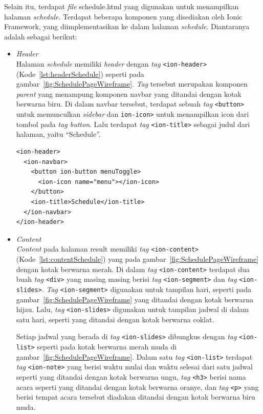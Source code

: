\begin{enumerate}
	Selain itu, terdapat \textit{file} schedule.html yang digunakan untuk menampilkan halaman \textit{schedule}. Terdapat beberapa komponen yang disediakan oleh Ionic Framework, yang diimplementasikan ke dalam halaman \textit{schedule}. Diantaranya adalah sebagai berikut:
	
	\begin{itemize}
		\item \textit{Header} \\
		Halaman \textit{schedule} memiliki \textit{header} dengan \textit{tag} \texttt{<ion-header>} (Kode~\ref{lst:headerSchedule}) seperti pada gambar~\ref{fig:SchedulePageWireframe}. \textit{Tag} tersebut merupakan komponen \textit{parent} yang menampung komponen navbar yang ditandai dengan kotak berwarna biru. Di dalam navbar tersebut, terdapat sebuah \textit{tag} \texttt{<button>} untuk memunculkan \textit{sidebar} dan \texttt{ion-icon>} untuk menampilkan icon dari tombol pada \textit{tag button}. Lalu terdapat \textit{tag} \texttt{<ion-title>} sebagai judul dari halaman, yaitu ``Schedule''.
		
\begin{lstlisting}[label={lst:headerSchedule}, caption=\textit{Header} pada schedule.html]
<ion-header>
  <ion-navbar>
    <button ion-button menuToggle>
      <ion-icon name="menu"></ion-icon>
    </button>
    <ion-title>Schedule</ion-title>
  </ion-navbar>
</ion-header>
\end{lstlisting} 

		\item \textit{Content} \\
		\textit{Content} pada halaman result memiliki \textit{tag} \texttt{<ion-content>} (Kode~\ref{lst:contentSchedule}) yang pada gambar~\ref{fig:SchedulePageWireframe} dengan kotak berwarna merah. Di dalam \textit{tag} \texttt{<ion-content>} terdapat dua buah \textit{tag} \texttt{<div>} yang masing masing berisi \textit{tag} \texttt{<ion-segment>} dan \textit{tag} \texttt{<ion-slides>}. \textit{Tag} \texttt{<ion-segment>} digunakan untuk tampilan hari, seperti pada gambar~\ref{fig:SchedulePageWireframe} yang ditandai dengan kotak berwarna hijau. Lalu, \textit{tag} \texttt{<ion-slides>} digunakan untuk tampilan jadwal di dalam satu hari, seperti yang ditandai dengan kotak berwarna coklat. 
		
		Setiap jadwal yang berada di \textit{tag} \texttt{<ion-slides>} dibungkus dengan \textit{tag} \texttt{<ion-list>} seperti pada kotak berwarna merah muda di gambar~\ref{fig:SchedulePageWireframe}. Dalam satu \textit{tag} \texttt{<ion-list>} terdapat \textit{tag} \texttt{<ion-note>} yang berisi waktu mulai dan waktu selesai dari satu jadwal seperti yang ditandai dengan kotak berwarna ungu, \textit{tag} \texttt{<h3>} berisi nama acara seperti yang ditandai dengan kotak berwarna oranye, dan \textit{tag} \texttt{<p>} yang berisi tempat acara tersebut diadakan ditandai dengan kotak berwarna biru muda.


\end{itemize}
\end{enumerate}
